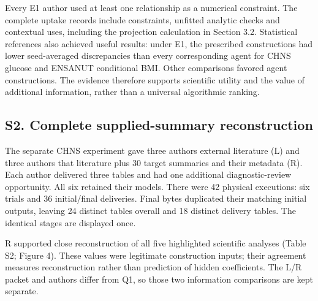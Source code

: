 \documentclass[10pt,twocolumn]{article}
\begin{document}
Every E1 author used at least one relationship as a numerical constraint. The complete uptake records include constraints, unfitted analytic checks and contextual uses, including the projection calculation in Section 3.2. Statistical references also achieved useful results: under E1, the prescribed constructions had lower seed-averaged discrepancies than every corresponding agent for CHNS glucose and ENSANUT conditional BMI. Other comparisons favored agent constructions. The evidence therefore supports scientific utility and the value of additional information, rather than a universal algorithmic ranking.


\subsection*{S2. Complete supplied-summary reconstruction}

The separate CHNS experiment gave three authors external literature (L) and three authors that literature plus 30 target summaries and their metadata (R). Each author delivered three tables and had one additional diagnostic-review opportunity. All six retained their models. There were 42 physical executions: six trials and 36 initial/final deliveries. Final bytes duplicated their matching initial outputs, leaving 24 distinct tables overall and 18 distinct delivery tables. The identical stages are displayed once.


R supported close reconstruction of all five highlighted scientific analyses (Table S2; Figure 4). These values were legitimate construction inputs; their agreement measures reconstruction rather than prediction of hidden coefficients. The L/R packet and authors differ from Q1, so those two information comparisons are kept separate.
\end{document}

